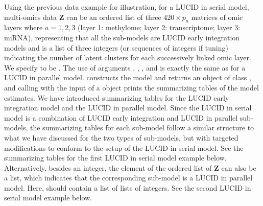 Using the previous data example for illustration, for a LUCID in serial model, multi-omics data $\bm Z$ can be an ordered list of three $420 \times p_a$ matrices of omic layers where $a = 1, 2, 3$ (layer 1: methylome; layer 2: transcriptome; layer 3: miRNA), representing that all the sub-models are LUCID early integration models and  is a list of three integers (or sequences of integers if tuning) indicating the number of latent clusters for each successively linked omic layer. We specify  to be . The use of arguments , , , and  is exactly the same as for a LUCID in parallel model.  constructs the model and returns an object of class , and calling  with the input of a  object prints the summarizing tables of the model estimates. We have introduced summarizing tables for the LUCID early integration model and the LUCID in parallel model. Since the LUCID in serial model is a combination of LUCID early integration and LUCID in parallel sub-models, the summarizing tables for each sub-model follow a similar structure to what we have discussed for the two types of sub-models, but with targeted modifications to conform to the setup of the LUCID in serial model. See the summarizing tables for the first LUCID in serial model example below. Alternatively, besides an integer, the element of the ordered list of $\bm Z$ can also be a list, which indicates that the corresponding sub-model is a LUCID in parallel model. Here,  should contain a list of lists of integers. See the second LUCID in serial model example below.

